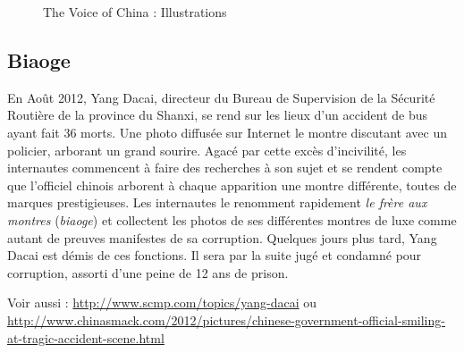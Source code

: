 \begin{figure}[htbp!]
    \caption{
      The Voice of China : Illustrations
    }
\end{figure}

\clearpage
\subsection*{Biaoge}
\label{sec:biaoge}

En Août 2012, Yang Dacai, directeur du Bureau de Supervision de la Sécurité Routière de la province du Shanxi, se rend sur les lieux d'un accident de bus ayant fait 36 morts. Une photo diffusée sur Internet le montre discutant avec un policier, arborant un grand sourire. Agacé par cette excès d'incivilité, les internautes commencent à faire des recherches à son sujet et se rendent compte que l'officiel chinois arborent à chaque apparition une montre différente, toutes de marques prestigieuses. Les internautes le renomment rapidement \textit{le frère aux montres} (\textit{biaoge}) et collectent les photos de ses différentes montres de luxe comme autant de preuves manifestes de sa corruption. Quelques jours plus tard, Yang Dacai est démis de ces fonctions. Il sera par la suite jugé et condamné pour corruption, assorti d'une peine de 12 ans de prison. 

Voir aussi : \url{http://www.scmp.com/topics/yang-dacai} ou \url{http://www.chinasmack.com/2012/pictures/chinese-government-official-smiling-at-tragic-accident-scene.html}

